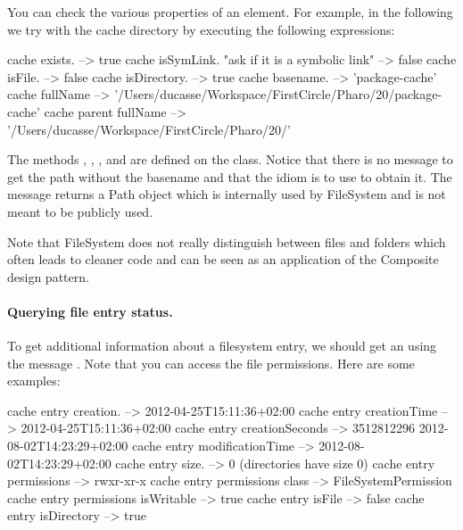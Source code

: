 \documentclass[a4paper,10pt,twoside]{book}
\begin{document}
You can check the various properties of an element. For example, in the following we try with the cache directory by executing the following expressions:

\begin{code}{}
cache exists.														--> true
cache isSymLink. "ask if it is a symbolic link"		--> false
cache isFile.														--> false
cache isDirectory.												--> true
cache basename.						    					 --> 'package-cache'
cache fullName           
  --> '/Users/ducasse/Workspace/FirstCircle/Pharo/20/package-cache'
cache parent fullName    
  --> '/Users/ducasse/Workspace/FirstCircle/Pharo/20/'
\end{code}
 


The methods , , , and   are defined on the  class. Notice that there is no message to get 
the path without the basename and that the idiom is to use  to obtain it.
The message  returns a Path object which is internally used by FileSystem and is not meant to be publicly used.
  
Note that FileSystem does not really distinguish between files and folders which often leads to cleaner code and can be seen as an application of the Composite design pattern.   
  
\paragraph{Querying file entry status.}
To get additional information about a filesystem entry, we should get an  using the message . Note that you can access the file permissions. Here are some examples:

\begin{code}{}
cache entry creation.					-->  2012-04-25T15:11:36+02:00
cache entry creationTime 			-->  2012-04-25T15:11:36+02:00
cache entry creationSeconds 	 -->  3512812296 2012-08-02T14:23:29+02:00
cache entry modificationTime 	 -->  2012-08-02T14:23:29+02:00
cache entry size.						  --> 0 (directories have size 0)
cache entry permissions				-->  rwxr-xr-x
cache entry permissions class	-->  FileSystemPermission
cache entry permissions isWritable --> true
cache entry isFile						--> false
cache entry isDirectory 			--> true
\end{code} 
\end{document}
